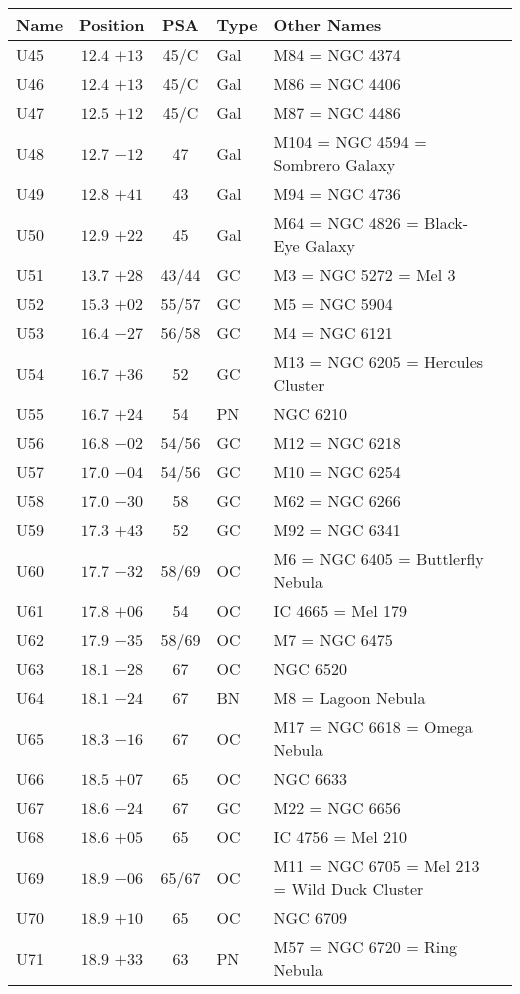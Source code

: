 \begin{table}[p]
\setlength{\tabcolsep}{3pt}
\small
\begin{tabular}{lcclll}
\hline
Name&Position&PSA&Type&Other Names\\
\hline
U45 &$12.4$ $+13$&45/C&Gal&M84 = NGC 4374\\
U46 &$12.4$ $+13$&45/C&Gal&M86 = NGC 4406\\
U47 &$12.5$ $+12$&45/C&Gal&M87 = NGC 4486\\
U48 &$12.7$ $-12$&47&Gal&M104 = NGC 4594 = Sombrero Galaxy\\
U49 &$12.8$ $+41$&43&Gal&M94 = NGC 4736\\
U50 &$12.9$ $+22$&45&Gal&M64 = NGC 4826 = Black-Eye Galaxy\\
U51 &$13.7$ $+28$&43/44&GC &M3 = NGC 5272 = Mel 3\\
U52 &$15.3$ $+02$&55/57&GC &M5 = NGC 5904\\
U53 &$16.4$ $-27$&56/58&GC &M4 = NGC 6121\\
U54 &$16.7$ $+36$&52&GC &M13 = NGC 6205 = Hercules Cluster\\
U55 &$16.7$ $+24$&54&PN &NGC 6210\\
U56 &$16.8$ $-02$&54/56&GC &M12 = NGC 6218\\
U57 &$17.0$ $-04$&54/56&GC &M10 = NGC 6254\\
U58 &$17.0$ $-30$&58&GC &M62 = NGC 6266\\
U59 &$17.3$ $+43$&52&GC &M92 = NGC 6341\\
U60 &$17.7$ $-32$&58/69&OC &M6 = NGC 6405 = Buttlerfly Nebula\\
U61 &$17.8$ $+06$&54&OC &IC 4665 = Mel 179\\
U62 &$17.9$ $-35$&58/69&OC &M7 = NGC 6475\\
U63 &$18.1$ $-28$&67&OC &NGC 6520\\
U64 &$18.1$ $-24$&67&BN &M8 = Lagoon Nebula\\
U65 &$18.3$ $-16$&67&OC &M17 = NGC 6618 = Omega Nebula\\
U66 &$18.5$ $+07$&65&OC &NGC 6633\\
U67 &$18.6$ $-24$&67&GC &M22 = NGC 6656\\
U68 &$18.6$ $+05$&65&OC &IC 4756 = Mel 210\\
U69 &$18.9$ $-06$&65/67&OC &M11 = NGC 6705 = Mel 213 = Wild Duck Cluster\\
U70 &$18.9$ $+10$&65&OC &NGC 6709\\
U71 &$18.9$ $+33$&63&PN &M57 = NGC 6720 = Ring Nebula\\

\end{tabular}
\end{table}
